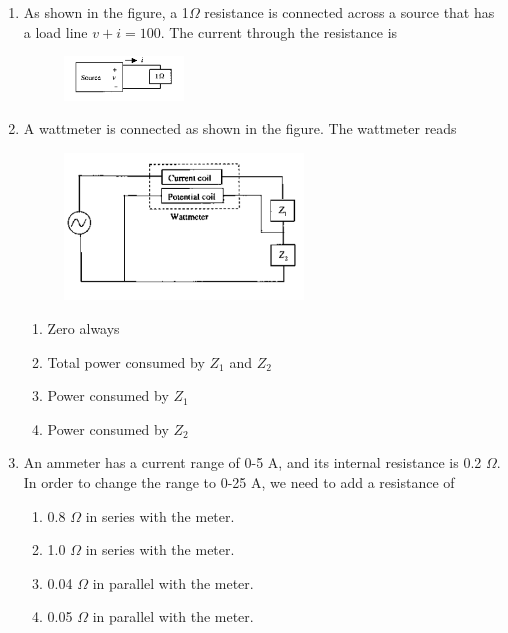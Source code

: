 \documentclass[12pt]{article}
\theoremstyle{remark}
\begin{document}
\begin{enumerate}
\item As shown in the figure, a 1$\Omega$ resistance is connected across a source that has a load line $v+i=100$. The current through the resistance is
\begin{figure}[H]
    \centering
    \includegraphics[width=0.3\textwidth]{Figs/Q7.png}
    \caption{}
    \label{fig:1.3}
\end{figure}
\begin{enumerate}
\end{enumerate}
\hfill{}

\item A wattmeter is connected as shown in the figure. The wattmeter reads
\begin{figure}[H]
    \centering
    \includegraphics[width=0.6\textwidth]{Figs/Q8.png}
    \caption{}
    \label{fig:1.4}
\end{figure}
\begin{enumerate}
    \item Zero always
    \item Total power consumed by $Z_1$ and $Z_2$
    \item Power consumed by $Z_1$
    \item Power consumed by $Z_2$
\end{enumerate}
\hfill{}

\item An ammeter has a current range of 0-5 A, and its internal resistance is 0.2 $\Omega$. In order to change the range to 0-25 A, we need to add a resistance of
\begin{enumerate}
    \item 0.8 $\Omega$ in series with the meter.
    \item 1.0 $\Omega$ in series with the meter.
    \item 0.04 $\Omega$ in parallel with the meter.
    \item 0.05 $\Omega$ in parallel with the meter.
\end{enumerate}
\hfill{}


\end{enumerate}
\end{document}
